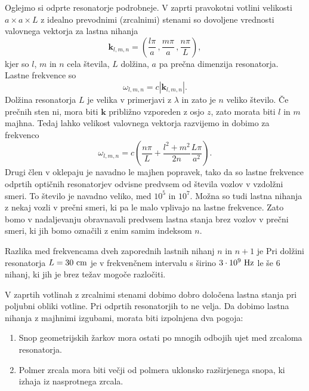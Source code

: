 Oglejmo si odprte resonatorje podrobneje. V zaprti pravokotni votlini velikosti
$a\times a\times L$ z idealno prevodnimi (zrcalnimi) stenami so dovoljene vrednosti
valovnega vektorja za lastna nihanja 
\begin{equation}
\mathbf{k}_{l,m,n}=\left(\frac{l\pi}{a}\,,\frac{m\pi}{a}\,,\frac{n\pi}{L}\right),\label{eq:k-votlina}
\end{equation}
 kjer so $l$, $m$ in $n$ cela števila, $L$ dolžina, $a$ pa prečna
dimenzija resonatorja. Lastne frekvence so 
\begin{equation}
\omega_{l,m,n}=c|\mathbf{k}_{l,m,n}|.\label{eq:omega-votlina}
\end{equation}
Dolžina resonatorja $L$ je velika v primerjavi z $\lambda$ in zato je $n$
veliko število. Če prečnih sten ni, mora biti $\mathbf{k}$ približno
vzporeden z osjo $z$, zato morata biti $l$ in $m$ majhna. Tedaj
lahko velikost valovnega vektorja razvijemo in dobimo za frekvenco
\begin{equation}
\omega_{l,m,n}=c\left(\frac{n\pi}{L}+\frac{l^{2}+m^{2}}{2n}\frac{L \pi}{a^{2}}\right).
\label{eq:delta-omega-resonator-razvoj}
\end{equation}
Drugi člen v oklepaju je navadno le majhen popravek, tako da so
lastne frekvence odprtih optičnih resonatorjev odvisne predvsem od
števila vozlov v vzdolžni smeri. To število je navadno veliko, med $10^{5}$
in $10^{7}$. Možna so tudi lastna nihanja z nekaj vozli v prečni
smeri, ki pa le malo vplivajo na lastne frekvence. Zato bomo v nadaljevanju
obravnavali predvsem lastna stanja brez vozlov v prečni smeri, ki
jih bomo označili z enim samim indeksom $n$.

Razlika med frekvencama dveh zaporednih lastnih nihanj 
$n$ in $n+1$ je
Pri dolžini resonatorja $L=30~\centi\metre$ je v frekvenčnem
intervalu s širino $3\cdot10^{9}~\hertz$ le še $6$ nihanj, ki jih
je brez težav mogoče razločiti.

V zaprtih votlinah z zrcalnimi stenami dobimo dobro določena lastna
stanja pri poljubni obliki votline. Pri odprtih resonatorjih to ne velja.
Da dobimo lastna nihanja z majhnimi izgubami, morata
biti izpolnjena dva pogoja:

\begin{enumerate} 
\item Snop geometrijskih žarkov mora ostati po mnogih odbojih ujet med zrcaloma resonatorja.\\
\item Polmer zrcala mora biti večji od polmera uklonsko razširjenega snopa, ki izhaja iz nasprotnega zrcala. 
\end{enumerate}

